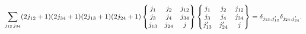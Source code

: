 \[\sum_{j_{12}\,j_{34}}(2j_{12}+1)(2j_{34}+1)(2j_{13}+1)(2j_{24}+1)\begin{%
Bmatrix}j_{1}&j_{2}&j_{12}\\
j_{3}&j_{4}&j_{34}\\
j_{13}&j_{24}&j\end{Bmatrix}\begin{Bmatrix}j_{1}&j_{2}&j_{12}\\
j_{3}&j_{4}&j_{34}\\
j^{\prime}_{13}&j^{\prime}_{24}&j\end{Bmatrix}=\delta_{j_{13},j^{\prime}_{13}}%
\delta_{j_{24},j^{\prime}_{24}}.\]